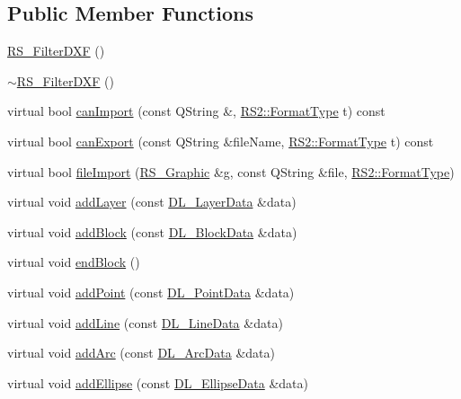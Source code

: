 \subsection*{Public Member Functions}
\begin{DoxyCompactItemize}
\item 
\hyperlink{classRS__FilterDXF_acffa87085a4a0efd349af8df71be9602}{R\-S\-\_\-\-Filter\-D\-X\-F} ()
\item 
\hyperlink{classRS__FilterDXF_a2aa19c87c956869a91f8f2a5ae6ee27d}{$\sim$\-R\-S\-\_\-\-Filter\-D\-X\-F} ()
\item 
virtual bool \hyperlink{classRS__FilterDXF_add335948d3bca1dd68b84f432f8e7628}{can\-Import} (const Q\-String \&, \hyperlink{classRS2_a077a6c94c9a0ab9962c4d4a612c7189b}{R\-S2\-::\-Format\-Type} t) const 
\item 
virtual bool \hyperlink{classRS__FilterDXF_a0d69c493c3416af868a1c16f864a3b71}{can\-Export} (const Q\-String \&file\-Name, \hyperlink{classRS2_a077a6c94c9a0ab9962c4d4a612c7189b}{R\-S2\-::\-Format\-Type} t) const 
\item 
virtual bool \hyperlink{classRS__FilterDXF_afa9715a120bca739600ff0fbeb913e65}{file\-Import} (\hyperlink{classRS__Graphic}{R\-S\-\_\-\-Graphic} \&g, const Q\-String \&file, \hyperlink{classRS2_a077a6c94c9a0ab9962c4d4a612c7189b}{R\-S2\-::\-Format\-Type})
\item 
virtual void \hyperlink{classRS__FilterDXF_a798b20591819f2e0b85344443a4b9ebd}{add\-Layer} (const \hyperlink{structDL__LayerData}{D\-L\-\_\-\-Layer\-Data} \&data)
\item 
virtual void \hyperlink{classRS__FilterDXF_ac4f4aa3c6f02af2bc14e908d2d1a4c82}{add\-Block} (const \hyperlink{structDL__BlockData}{D\-L\-\_\-\-Block\-Data} \&data)
\item 
virtual void \hyperlink{classRS__FilterDXF_a72cf64dcc0bc4f8ee4cae964534d15f1}{end\-Block} ()
\item 
virtual void \hyperlink{classRS__FilterDXF_aee7bbcebddf3c5667f2fe0bc854f3d23}{add\-Point} (const \hyperlink{structDL__PointData}{D\-L\-\_\-\-Point\-Data} \&data)
\item 
virtual void \hyperlink{classRS__FilterDXF_a576c3d5f4fbaadde5ad2fc3af713d2df}{add\-Line} (const \hyperlink{structDL__LineData}{D\-L\-\_\-\-Line\-Data} \&data)
\item 
virtual void \hyperlink{classRS__FilterDXF_a8bc60141110bcb885b2a7a98ebe4eae1}{add\-Arc} (const \hyperlink{structDL__ArcData}{D\-L\-\_\-\-Arc\-Data} \&data)
\item 
virtual void \hyperlink{classRS__FilterDXF_a6256a85dcd658c094fe99467be324c9e}{add\-Ellipse} (const \hyperlink{structDL__EllipseData}{D\-L\-\_\-\-Ellipse\-Data} \&data)

\end{DoxyCompactItemize}
